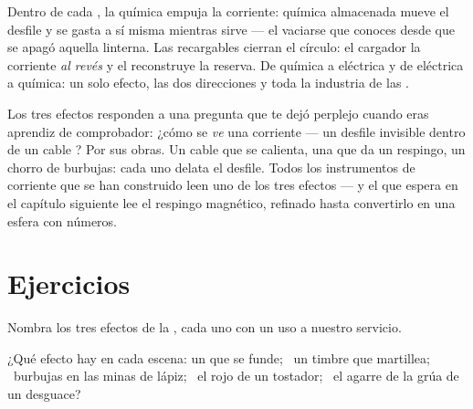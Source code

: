 \begin{example}\label{ex:g8:electric-current-effects:battery}
Dentro de cada , la química empuja la corriente:
 química almacenada mueve el desfile y se gasta a sí misma
mientras sirve --- el vaciarse que conoces desde que se apagó aquella
linterna. Las  recargables cierran el círculo: el cargador
 la corriente \emph{al revés} y el 
reconstruye la reserva. De química a eléctrica y de eléctrica a
química: un solo efecto, las dos direcciones y toda la industria de
las .
\end{example}

\begin{remark}\label{rem:g8:electric-current-effects:detect}
Los tres efectos responden a una pregunta que te dejó perplejo cuando
eras aprendiz de comprobador: ¿cómo se \emph{ve} una corriente --- un
desfile invisible dentro de un cable ? Por sus obras. Un
cable que se calienta, una  que da un respingo, un chorro de
burbujas: cada uno delata el desfile. Todos los instrumentos de 
corriente que se han construido leen uno de los tres efectos --- y el
que espera en el capítulo siguiente lee el respingo magnético,
refinado hasta convertirlo en una esfera con números.
\end{remark}

\section{Ejercicios}

\begin{exercise}[$\star$]\label{exo:g8:electric-current-effects:1}
Nombra los tres efectos de la , cada uno con un
uso a nuestro servicio.
\end{exercise}

\begin{exercise}[$\star$]\label{exo:g8:electric-current-effects:2}
¿Qué efecto hay en cada escena: un  que se
funde; \ un timbre que martillea; \ burbujas en las minas de
lápiz; \ el rojo de un tostador; \ el agarre de la grúa de un
desguace?
\end{exercise}

